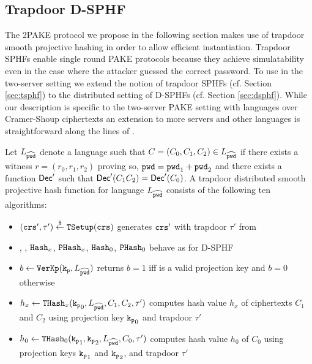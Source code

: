 

\subsection{Trapdoor D-SPHF}\label{sec:tdsphf}
The 2PAKE protocol we propose in the following section makes use of trapdoor smooth projective hashing in order to allow efficient instantiation.
Trapdoor SPHFs enable single round PAKE protocols because they achieve simulatability even in the case where the attacker guessed the correct password.
To use \TSPHF in the two-server setting we extend the notion of trapdoor SPHFs (cf. Section \ref{sec:tsphf}) to the distributed setting of D-SPHFs (cf. Section \ref{sec:dsphf}).
While our description is specific to the two-server PAKE setting with languages over Cramer-Shoup ciphertexts an extension to more servers and other languages is straightforward along the lines of \DSPHF.

\begin{definition}[TD-SPHF]\label{def:tdsphf}
Let $L_{\widehat{\mathtt{pwd}}}$ denote a language such that $C=(C_0,C_1,C_2)\in L_{\widehat{\mathtt{pwd}}}$ if there exists a witness $r=(r_0,r_1,r_2)$ proving so, $\mathtt{pwd}=\mathtt{pwd}_1+\mathtt{pwd}_2$ and there exists a function $\mathsf{Dec}'$ such that $\mathsf{Dec}'(C_1 C_2)=\mathsf{Dec}'(C_0)$.
A trapdoor distributed smooth projective hash function for language $L_{\widehat{\mathtt{pwd}}}$ consists of the following ten algorithms:

\begin{itemize}
	\item $(\mathtt{crs}',\tau')\stackrel{\$}{\gets}\mathtt{TSetup}(\mathtt{crs})$ generates $\mathtt{crs}'$ with trapdoor $\tau'$ from \crs

	\item \HKGen, \PKGen, $\mathtt{Hash}_x$, $\mathtt{PHash}_x$, $\mathtt{Hash}_0$, $\mathtt{PHash}_0$ behave as for D-SPHF
	
	\item $b\gets\mathtt{VerKp}(\mathtt{k_p},L_{\widehat{\mathtt{pwd}}})$ returns $b=1$ iff \hp is a valid projection key and $b=0$ otherwise
	
	\item $h_x\gets\mathtt{THash}_x(\mathtt{k_p}_0,L_{\widehat{\mathtt{pwd}}},C_1,C_2,\tau')$ computes hash value $h_x$ of ciphertexts $C_1$ and $C_2$ using projection key $\mathtt{k_p}_0$ and trapdoor $\tau'$
	
	\item $h_0\gets\mathtt{THash}_0(\mathtt{k_p}_1,\mathtt{k_p}_2,L_{\widehat{\mathtt{pwd}}},C_0,\tau')$ computes hash value $h_0$ of $C_0$ using projection keys $\mathtt{k_p}_1$ and $\mathtt{k_p}_2$, and trapdoor $\tau'$
\end{itemize}
\end{definition}


